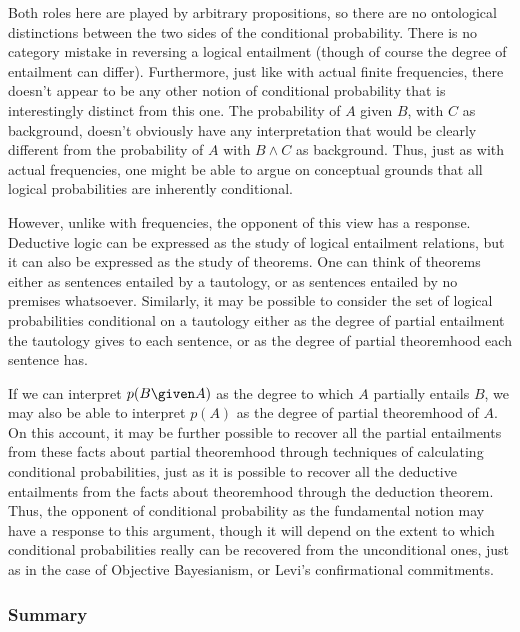 Both roles here are played by arbitrary propositions, so there are no ontological distinctions between the two sides of the conditional probability. There is no category mistake in reversing a logical entailment (though of course the degree of entailment can differ). Furthermore, just like with actual finite frequencies, there doesn't appear to be any other notion of conditional probability that is interestingly distinct from this one. The probability of $A$ given $B$, with $C$ as background, doesn't obviously have any interpretation that would be clearly different from the probability of $A$ with $B\land C$ as background. Thus, just as with actual frequencies, one might be able to argue on conceptual grounds that all logical probabilities are inherently conditional.

However, unlike with frequencies, the opponent of this view has a response. Deductive logic can be expressed as the study of logical entailment relations, but it can also be expressed as the study of theorems. One can think of theorems either as sentences entailed by a tautology, or as sentences entailed by no premises whatsoever. Similarly, it may be possible to consider the set of logical probabilities conditional on a tautology either as the degree of partial entailment the tautology gives to each sentence, or as the degree of partial theoremhood each sentence has.

If we can interpret $p(B \given A)$ as the degree to which $A$ partially entails $B$, we may also be able to interpret $p(A)$ as the degree of partial theoremhood of $A$. On this account, it may be further possible to recover all the partial entailments from these facts about partial theoremhood through techniques of calculating conditional probabilities, just as it is possible to recover all the deductive entailments from the facts about theoremhood through the deduction theorem. Thus, the opponent of conditional probability as the fundamental notion may have a response to this argument, though it will depend on the extent to which conditional probabilities really can be recovered from the unconditional ones, just as in the case of Objective Bayesianism, or Levi's confirmational commitments.

\subsubsection{Summary}


